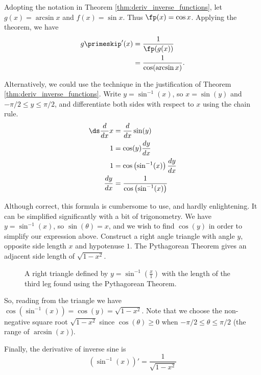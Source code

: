 \begin{solution}
 Adopting the notation in Theorem \ref{thm:deriv_inverse_functions}, let $g(x) = \arcsin x$ and $f(x) = \sin x$. Thus $\fp(x) = \cos x$. Applying the theorem, we have 
			\begin{align*}
			g\primeskip'(x) &= \frac{1}{\fp(g(x))} \\
						&= \frac{1}{\cos(\arcsin x)}.
			\end{align*}
			
Alternatively, we could use the technique in the justification of Theorem \ref{thm:deriv_inverse_functions}. Write $y=\sin^{-1}(x)$, so $x=\sin(y)$ and $-\pi/2\leq y\leq \pi/2$, and differentiate both sides with respect to $x$ using the chain rule.
\begin{align*}
\ds\frac{d}{dx}x&=\frac{d}{dx}\sin(y)	\\
1&=\cos(y)\frac{dy}{dx}	\\
1&=\cos\left(\sin^{-1}(x)\right)\frac{dy}{dx}	\\
\frac{dy}{dx}&=\frac{1}{\cos\left(\sin^{-1}(x)\right)}
\end{align*}

Although correct, this formula is cumbersome to use, and hardly enlightening. It can be simplified significantly with a bit of trigonometry. We have   $y =\sin^{-1}(x)$, so $\sin(\theta)=x$, and we wish to find $ \cos(y) $ in order to simplify our expression above. Construct a right angle triangle with angle $y$, opposite side length $x$ and hypotenuse $ 1 $.  The Pythagorean  Theorem gives an adjacent side length of $\sqrt{1-x^2}$.


\begin{figure}
\centering
{}

\caption{\label{fig:inverse3}A right triangle defined by $y=\sin ^{-1}(\frac{x}{1})$ with the length of the third leg found using the Pythagorean Theorem.}
\end{figure}


So, reading from the triangle we have $\cos\left(\sin^{-1}(x)\right)=\cos(y)=\sqrt{1-x^2}$. Note that we choose the non-negative square root $\sqrt{1-x^2}$ since $\cos(\theta)\geq 0$ when $-\pi/2\leq\theta\leq\pi/2$ (the range of $ \arcsin(x) $).

Finally, the derivative of inverse sine is
\[\left(\sin^{-1}(x)\right)'=\frac{1}{\sqrt{1-x^2}}\]
\end{solution}

